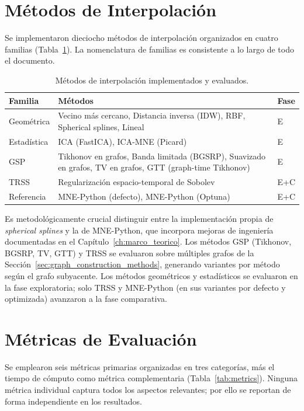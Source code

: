 \section{Métodos de Interpolación}
\label{sec:interpolation_methods}

Se implementaron dieciocho métodos de interpolación organizados en cuatro familias (Tabla~\ref{tab:methods}). La nomenclatura de familias es consistente a lo largo de todo el documento.

\begin{table}[htbp]
\centering
\caption{Métodos de interpolación implementados y evaluados.}
\label{tab:methods}
\small
\begin{tabular}{@{}lp{6.5cm}l@{}}
\toprule
Familia & Métodos & Fase \\
\midrule
Geométrica & Vecino más cercano, Distancia inversa (IDW), RBF, Spherical splines, Lineal & E \\
Estadística & ICA (FastICA), ICA-MNE (Picard) & E \\
GSP & Tikhonov en grafos, Banda limitada (BGSRP), Suavizado en grafos, TV en grafos, GTT (graph-time Tikhonov) & E \\
TRSS & Regularización espacio-temporal de Sobolev & E+C \\
Referencia & MNE-Python (defecto), MNE-Python (Optuna) & E+C \\
\bottomrule
\end{tabular}
\end{table}

Es metodológicamente crucial distinguir entre la implementación propia de \textit{spherical splines} y la de MNE-Python, que incorpora mejoras de ingeniería documentadas en el Capítulo~\ref{ch:marco_teorico}. Los métodos GSP (Tikhonov, BGSRP, TV, GTT) y TRSS se evaluaron sobre múltiples grafos de la Sección~\ref{sec:graph_construction_methods}, generando variantes por método según el grafo subyacente. Los métodos geométricos y estadísticos se evaluaron en la fase exploratoria; solo TRSS y MNE-Python (en sus variantes por defecto y optimizada) avanzaron a la fase comparativa.

\section{Métricas de Evaluación}
\label{sec:metricas}

Se emplearon seis métricas primarias organizadas en tres categorías, más el tiempo de cómputo como métrica complementaria (Tabla~\ref{tab:metrics}). Ninguna métrica individual captura todos los aspectos relevantes; por ello se reportan de forma independiente en los resultados.

